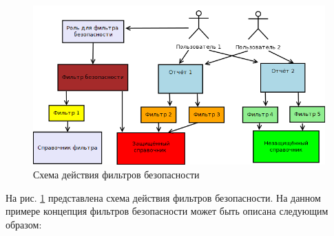 \documentclass[../user-manual.tex]{subfiles}
\begin{document}
	\begin{figure}[h]
		\centering
		\includegraphics[width=\graphicswidth]{img/11-sf-concept-diagram.png}
		\caption{Схема действия фильтров безопасности}
		\label{fig:sf-concept-diagram}
	\end{figure}

	На рис. \ref{fig:sf-concept-diagram} представлена схема действия фильтров безопасности. На данном примере концепция фильтров безопасности может быть описана следующим образом:
	
\end{document}
